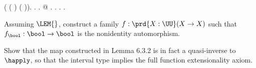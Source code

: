 \begin{coqdoccode}
\coqdocindent{1.00em}
 ( (     ) ( )). .\coqdoceol
\coqdocindent{1.00em}
 .  \coqdocnotation{(}@ \coqdocvar{\_} \coqdocvar{\_}  \coqdocvar{\_} \coqref{Ch06 3.::'[' x ';' '..' ';' x ']'}{\coqdocnotation{[}}\coqref{Ch06 3.::'[' x ';' '..' ';' x ']'}{\coqdocnotation{]}} \coqdocnotation{)\^{}}.  .\coqdoceol
\coqdocnoindent
{}.\coqdoceol
\coqdocemptyline
\coqdocnoindent
{}\coqdocindent{0.50em}
  .\coqdoceol
\coqdocemptyline
\end{coqdoccode}
Assuming $\LEM{}$, construct a family $f : \prd{X : \UU} (X \to X)$ such that
$f_{\bool} : \bool \to \bool$ is the nonidentity automorphism.


Show that the map constructed in Lemma 6.3.2 is in fact a quasi-inverse to
$\happly$, so that the interval type implies the full function extensionality
axiom.


